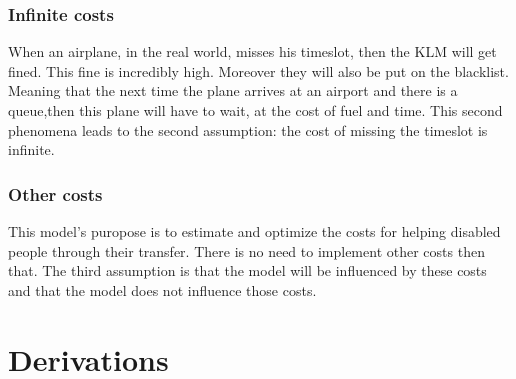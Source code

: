 \documentclass[a4paper, 11pt, notitlepage]{report}
\begin{document}
		\subsubsection{Infinite costs} When an airplane, in the real world, misses his timeslot, then the KLM will get fined. This fine is incredibly high. Moreover they will also be put on the blacklist. Meaning that the next time the plane arrives at an airport and there is a queue,then this plane will have to wait, at the cost of fuel and time. This second phenomena leads to the second assumption: the cost of missing the timeslot is infinite.
		
		\subsubsection{Other costs} This model's puropose is to estimate and optimize the costs for helping disabled people through their transfer. There is no need to implement other costs then that. The third assumption is that the model will be influenced by these costs and that the model does not influence those costs.
		
\section{Derivations}
\end{document}

